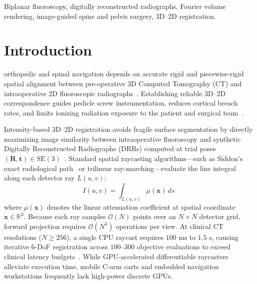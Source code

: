 \documentclass[journal,twoside,web]{ieeecolor}
\begin{document}
\begin{abstract}
PoU-FVR to isotropic $4{\times}4{\times}4@64$ slabs eliminates wide-field CT magnification drift ($100.0\% <2\text{ mm}$ standalone across all four clinical Spine and Abdominal CT cohorts: $0.307\text{--}1.406\text{ mm}$ median, and $91.7\% <2\text{ mm}$ on DeepFluoro), while pairing $K{=}4$ multi-survivor PoU-Triton with a $20$-step \texttt{f32} \texttt{nanodrr} polish after per-axis isocenter parity calibration achieves $\mathbf{0.835\text{ mm}}$ median mTRE ($\mathbf{100.0\% <2\text{ mm}}$ overall and on unanchored Tier~2) on DeepFluoro in $\mathbf{1.37\text{ s}}$ reg ($\mathbf{1.81\text{ s}}$ total) and only $\mathbf{464.1\text{ MB}}$ peak VRAM ($<0.5\text{ GB}$), alongside $0.046\text{--}0.642\text{ mm}$ median error on clinical Spine and Abdominal CT.
\end{abstract}

\begin{IEEEkeywords}
Biplanar fluoroscopy, digitally reconstructed radiographs, Fourier volume rendering, image-guided spine and pelvis surgery, 3D--2D registration.
\end{IEEEkeywords}

\section{Introduction}
 orthopedic and spinal navigation depends on accurate rigid and piecewise-rigid spatial alignment between pre-operative 3D Computed Tomography (CT) and intraoperative 2D fluoroscopic radiographs~\cite{markelj2012review,van2018evaluation}. Establishing reliable 3D--2D correspondence guides pedicle screw instrumentation, reduces cortical breach rates, and limits ionizing radiation exposure to the patient and surgical team~\cite{knez2020computer}.

Intensity-based 3D--2D registration avoids fragile surface segmentation by directly maximizing image similarity between intraoperative fluoroscopy and synthetic Digitally Reconstructed Radiographs (DRRs) computed at trial poses $(\mathbf{R}, \mathbf{t}) \in \mathrm{SE}(3)$~\cite{unberath2021impact}. Standard spatial raycasting algorithms---such as Siddon's exact radiological path~\cite{siddon1985fast} or trilinear ray-marching---evaluate the line integral along each detector ray $L(u,v)$:
\begin{equation}
I(u,v) = \int_{L(u,v)} \mu(\mathbf{x})\, ds
\end{equation}
where $\mu(\mathbf{x})$ denotes the linear attenuation coefficient at spatial coordinate $\mathbf{x} \in \mathbb{R}^3$. Because each ray samples $\mathcal{O}(N)$ points over an $N \times N$ detector grid, forward projection requires $\mathcal{O}(N^3)$ operations per view. At clinical CT resolutions ($N \ge 256$), a single CPU raycast requires $100\text{ ms}$ to $1.5\text{ s}$, causing iterative 6-DoF registration across $100$--$300$ objective evaluations to exceed clinical latency budgets~\cite{gopalakrishnan2022drr,killeen2023diffdrr}. While GPU-accelerated differentiable raycasters alleviate execution time, mobile C-arm carts and embedded navigation workstations frequently lack high-power discrete GPUs.
\end{document}
